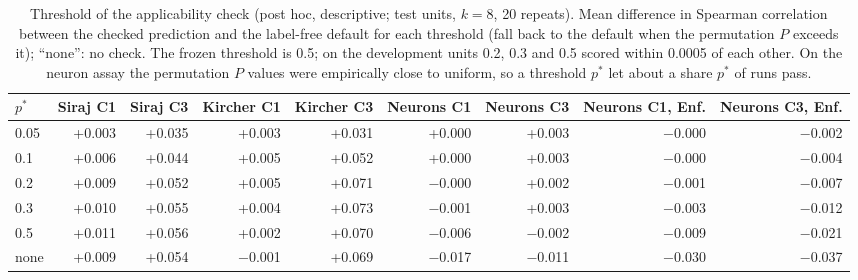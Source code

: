 \begin{table}[H]
\caption{Threshold of the applicability check (post hoc, descriptive; test units, $k=8$, 20 repeats). Mean difference in Spearman correlation between the checked prediction and the label-free default for each threshold (fall back to the default when the permutation $P$ exceeds it); ``none'': no check. The frozen threshold is 0.5; on the development units 0.2, 0.3 and 0.5 scored within 0.0005 of each other. On the neuron assay the permutation $P$ values were empirically close to uniform, so a threshold $p^*$ let about a share $p^*$ of runs pass.}\label{tab:s12}
\centering\small
\begin{tabular}{lrrrrrrrr}
\toprule
$p^*$ & Siraj C1 & Siraj C3 & Kircher C1 & Kircher C3 & Neurons C1 & Neurons C3 & Neurons C1, Enf. & Neurons C3, Enf. \\
\midrule
0.05 & +0.003 & +0.035 & +0.003 & +0.031 & +0.000 & +0.003 & $-$0.000 & $-$0.002 \\
0.1 & +0.006 & +0.044 & +0.005 & +0.052 & +0.000 & +0.003 & $-$0.000 & $-$0.004 \\
0.2 & +0.009 & +0.052 & +0.005 & +0.071 & $-$0.000 & +0.002 & $-$0.001 & $-$0.007 \\
0.3 & +0.010 & +0.055 & +0.004 & +0.073 & $-$0.001 & +0.003 & $-$0.003 & $-$0.012 \\
0.5 & +0.011 & +0.056 & +0.002 & +0.070 & $-$0.006 & $-$0.002 & $-$0.009 & $-$0.021 \\
none & +0.009 & +0.054 & $-$0.001 & +0.069 & $-$0.017 & $-$0.011 & $-$0.030 & $-$0.037 \\
\bottomrule
\end{tabular}
\end{table}

